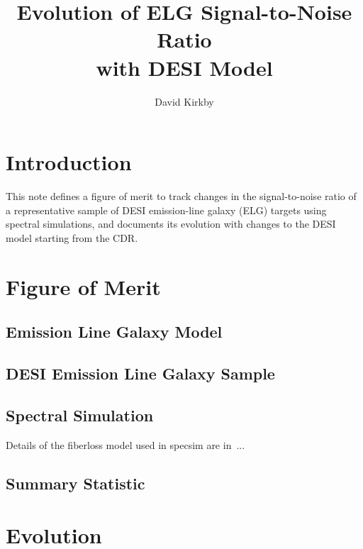 \documentclass[12pt]{article}
\title{Evolution of ELG Signal-to-Noise Ratio\\
with DESI Model\\
\vspace{5mm}{\large\bf DESI-doc-3977-v1}}
\author{David Kirkby}
\begin{document}
\maketitle

\section{Introduction}

This note defines a figure of merit to track changes in the signal-to-noise ratio of a representative sample of DESI emission-line galaxy (ELG)
targets using spectral simulations, and documents its evolution with changes to the DESI model starting from the CDR\cite{desi-867}.

\section{Figure of Merit}

\subsection{Emission Line Galaxy Model}

\subsection{DESI Emission Line Galaxy Sample}

\subsection{Spectral Simulation}

Details of the fiberloss model used in specsim are in~\cite{desi-2720}...

\subsection{Summary Statistic}

\section{Evolution}




\end{document}
